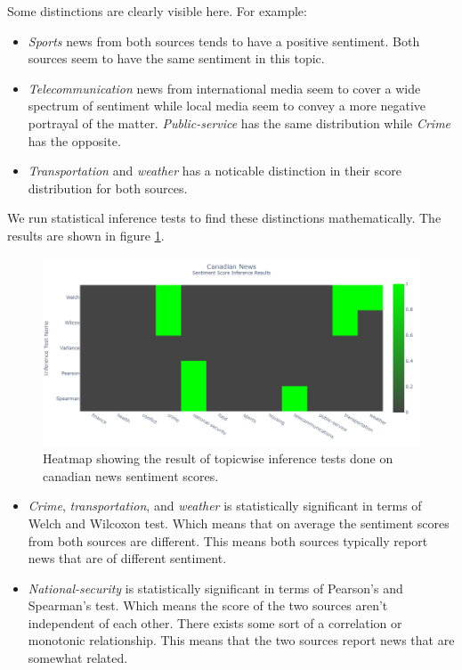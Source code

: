 \documentclass{article}
\theoremstyle{mytheoremstyle}
\theoremstyle{mytheoremstyle}
\theoremstyle{myproblemstyle}
\begin{document}
    Some distinctions are clearly visible here. For example:

    \begin{itemize}
        \item \emph{Sports} news from both sources tends to have a positive sentiment. Both sources seem to have the same sentiment in this topic.
        \item \emph{Telecommunication} news from international media seem to cover a wide spectrum of sentiment while local media seem to convey a more negative portrayal of the matter. \emph{Public-service} has the same distribution while \emph{Crime} has the opposite.
        \item \emph{Transportation} and \emph{weather} has a noticable distinction in their score distribution for both sources.
    \end{itemize}

    We run statistical inference tests to find these distinctions mathematically. The results are shown in figure \ref{fig:canada_sentiment_score_heatmap}.

    \begin{figure}[hp]
        \centering
        \includegraphics[width=\linewidth]{../images/plots/Canada/canada_heatmap_inference_sentiment.png}
        \caption{Heatmap showing the result of topicwise inference tests done on canadian news sentiment scores.}
        \label{fig:canada_sentiment_score_heatmap}
    \end{figure}

    \begin{itemize}
        \item \emph{Crime}, \emph{transportation}, and \emph{weather} is statistically significant in terms of Welch and Wilcoxon test. Which means that on average the sentiment scores from both sources are different. This means both sources typically report news that are of different sentiment.
        \item \emph{National-security} is statistically significant in terms of Pearson's and Spearman's test. Which means the score of the two sources aren't independent of each other. There exists some sort of a correlation or monotonic relationship. This means that the two sources report news that are somewhat related. 
    \end{itemize}
\end{document}
